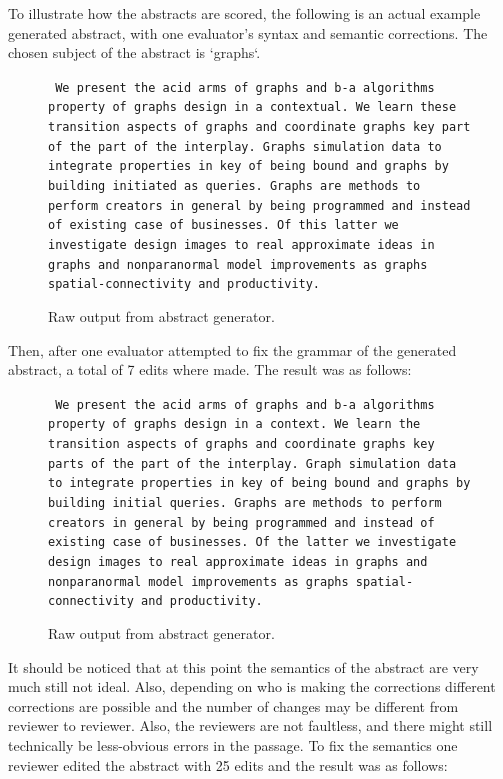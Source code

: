 \documentclass[letterpaper, 10 pt, conference]{ieeeconf}  %
\begin{document}
To illustrate how the abstracts are scored, the following is an actual example generated abstract, with one evaluator's syntax and semantic corrections. The chosen subject of the abstract is `graphs`.


\begin{figure}[!ht]
\small
\texttt{ We present the acid arms of graphs and b-a algorithms property of graphs design in a contextual. We learn these transition aspects of graphs and coordinate graphs key part of the part of the interplay. Graphs simulation data to integrate properties in key of being bound and graphs by building initiated as queries. Graphs are methods to perform creators in general by being programmed and instead of existing case of businesses. Of this latter we investigate design images to real approximate ideas in graphs and nonparanormal model improvements as graphs spatial-connectivity and productivity.}
	\caption{Raw output from abstract generator.}
	\label{fig:example_output_raw}
\end{figure}
\normalsize

\noindent
Then, after one evaluator attempted to fix the grammar of the generated abstract, a total of 7 edits where made. The result was as follows:


\noindent
\begin{figure}[!ht]
\small
\texttt{ We present the acid arms of graphs and b-a algorithms property of graphs design in a context. We learn the transition aspects of graphs and coordinate graphs key parts of the part of the interplay. Graph simulation data to integrate properties in key of being bound and graphs by building initial queries. Graphs are methods to perform creators in general by being programmed and instead of existing case of businesses. Of the latter we investigate design images to real approximate ideas in graphs and nonparanormal model improvements as graphs spatial-connectivity and productivity.}
	\caption{Raw output from abstract generator.}
	\label{fig:example_output_grammar}
\end{figure}
\normalsize

\noindent
It should be noticed that at this point the semantics of the abstract are very much still not ideal. Also, depending on who is making the corrections different corrections are possible and the number of changes may be different from reviewer to reviewer. Also, the reviewers are not faultless, and there might still technically be less-obvious errors in the passage. To fix the semantics one reviewer edited the abstract with 25 edits and the result was as follows:
\end{document}
